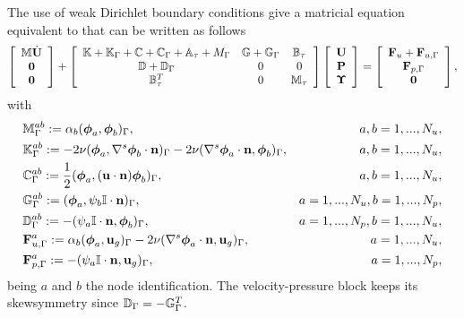 The use of weak Dirichlet boundary conditions give a matricial equation equivalent to  that can be written as follows
\begin{equation}
\label{eq-C7_NSmatform_weak}
\left[\begin{array}{c}
\mathbb{M}\dot{{\bf U}}\\
\mathbf{0}\\
\mathbf{0}
\end{array}\right]+\left[\begin{array}{ccc}
\mathbb{K}+\mathbb{K}_\Gamma+\mathbb{C}+\mathbb{C}_\Gamma+\mathbb{A}_\tau+M_\Gamma&\mathbb{G}+\mathbb{G}_\Gamma&\mathbb{B}_\tau\\
\mathbb{D}+\mathbb{D}_\Gamma&0&0\\
\mathbb{B}_\tau^T&0&\mathbb{M}_\tau
\end{array}\right]\left[\begin{array}{c}
{\bf U}\\
{\bf P}\\
\boldsymbol{\Upsilon}
\end{array}\right]=\left[\begin{array}{c}
{\bf F}_u+{\bf F}_{u,\Gamma}\\
{\bf F}_{p,\Gamma}\\
\mathbf{0}
\end{array}\right],
\end{equation}
with 
\begin{align*}
&\mathbb{M}_{\Gamma}^{ab}:=\alpha_b(\boldsymbol{\phi}_{a},\boldsymbol{\phi}_{b})_\Gamma,&a,b=1,...,N_u,\\
&\mathbb{K}_{\Gamma}^{ab}:=-2\nu(\boldsymbol{\phi}_{a},\nabla^s\boldsymbol{\phi}_{b}\cdot{\bf n})_\Gamma-2\nu(\nabla^s\boldsymbol{\phi}_{a}\cdot{\bf n},\boldsymbol{\phi}_{b})_\Gamma,&a,b=1,...,N_u,\\
&\mathbb{C}_{\Gamma}^{ab}:=\frac{1}{2}(\boldsymbol{\phi}_{a},({\bf u}\cdot{\bf n})\boldsymbol{\phi}_{b})_\Gamma,&a,b=1,...,N_u,\\
&\mathbb{G}_{\Gamma}^{ab}:=(\boldsymbol{\phi}_{a},\psi_{b}\mathbb{I}\cdot{\bf n})_\Gamma,&a=1,...,N_u,b=1,...,N_p,\\
&\mathbb{D}_{\Gamma}^{ab}:=-(\psi_{a}\mathbb{I}\cdot{\bf n},\boldsymbol{\phi}_{b})_\Gamma,&a=1,...,N_p,b=1,...,N_u,\\
&{\bf F}_{u,\Gamma}^{a}:=\alpha_b(\boldsymbol{\phi}_{a},{\bf u}_g)_\Gamma-2\nu(\nabla^s\boldsymbol{\phi}_{a}\cdot{\bf n},{\bf u}_g)_\Gamma,&a=1,...,N_u,\\
&{\bf F}_{p,\Gamma}^{a}:=-(\psi_{a}\mathbb{I}\cdot{\bf n},{\bf u}_g)_\Gamma,&a=1,...,N_p,
\end{align*}
being $a$ and $b$ the node identification. The velocity-pressure block keeps its skewsymmetry since $\mathbb{D}_\Gamma=-\mathbb{G}_\Gamma^T$.

